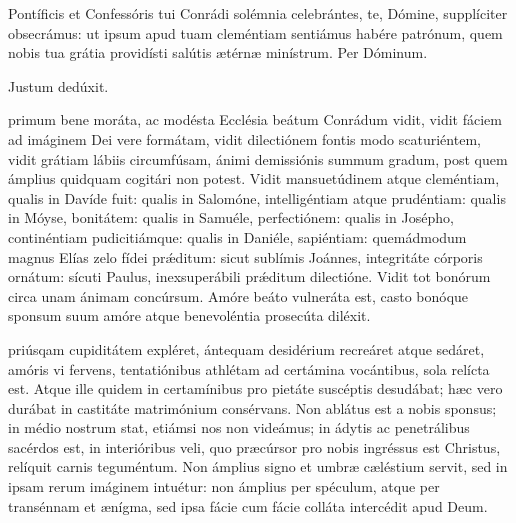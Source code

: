 \documentclass[fontsize=9pt,paper=A6,twoside,BCOR=1mm,DIV=22,headinclude]{scrarticle}
\begin{document}
\begin{multicols}{2}

\AiCP 

\VRCPi 

 Pontíficis et Confessóris tui Conrádi solémnia celebrántes, te, Dómine, supplíciter obsecrámus: ut ipsum apud tuam cleméntiam sentiámus habére patrónum, quem nobis tua grátia providísti salútis ætérnæ minístrum. Per Dóminum.

\columnbreak
{}

\AiiCP

\VRCPii 


\AiiiCP

\V Justum dedúxit.


{

 primum bene moráta, ac modésta Ecclésia beátum Conrádum vidit, vidit fáciem ad imáginem Dei vere formátam, vidit dilectiónem fontis modo scaturiéntem, vidit grátiam lábiis circumfúsam, ánimi demissiónis summum gradum, post quem ámplius quidquam cogitári non potest. Vidit mansuetúdinem atque cleméntiam, qualis in Davíde fuit: qualis in Salomóne, intelligéntiam atque prudéntiam: qualis in Móyse, bonitátem: qualis in Samuéle, perfectiónem: qualis in Josépho, continéntiam pudicitiámque: qualis in Daniéle, sapiéntiam: quemádmodum magnus Elías zelo fídei pr\'æditum: sicut sublímis Joánnes, integritáte córporis ornátum: sícuti Paulus, inexsuperábili pr\'æditum dilectióne. Vidit tot bonórum circa unam ánimam concúrsum. Amóre beáto vulneráta est, casto bonóque sponsum suum amóre atque benevoléntia prosecúta diléxit.

\RVCPiv 

 priúsqam cupiditátem expléret, ántequam desidérium recreáret atque sedáret, amóris vi fervens, tentatiónibus athlétam ad certámina vocántibus, sola relícta est. Atque ille quidem in certamínibus pro pietáte suscéptis desudábat; hæc vero durábat in castitáte matrimónium consérvans. Non ablátus est a nobis sponsus; in médio nostrum stat, etiámsi nos non videámus; in ádytis ac penetrálibus sacérdos est, in interióribus veli, quo præcúrsor pro nobis ingréssus est Christus, relíquit carnis teguméntum. Non ámplius signo et umbræ cæléstium servit, sed in ipsam rerum imáginem intuétur: non ámplius per spéculum, atque per transénnam et ænígma, sed ipsa fácie cum fácie colláta intercédit apud Deum.

}
\end{multicols}
\end{document}
